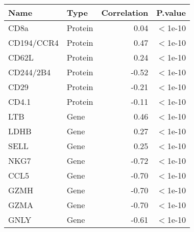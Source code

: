 \begin{tabular}{llrl}
  \hline
Name & Type & Correlation & P.value \\ 
  \hline
CD8a & Protein & 0.04 & $<$1e-10 \\ 
  CD194/CCR4 & Protein & 0.47 & $<$1e-10 \\ 
  CD62L & Protein & 0.24 & $<$1e-10 \\ 
  CD244/2B4 & Protein & -0.52 & $<$1e-10 \\ 
  CD29 & Protein & -0.21 & $<$1e-10 \\ 
  CD4.1 & Protein & -0.11 & $<$1e-10 \\ 
  LTB & Gene & 0.46 & $<$1e-10 \\ 
  LDHB & Gene & 0.27 & $<$1e-10 \\ 
  SELL & Gene & 0.25 & $<$1e-10 \\ 
  NKG7 & Gene & -0.72 & $<$1e-10 \\ 
  CCL5 & Gene & -0.70 & $<$1e-10 \\ 
  GZMH & Gene & -0.70 & $<$1e-10 \\ 
  GZMA & Gene & -0.70 & $<$1e-10 \\ 
  GNLY & Gene & -0.61 & $<$1e-10 \\ 
   \hline
\end{tabular}
